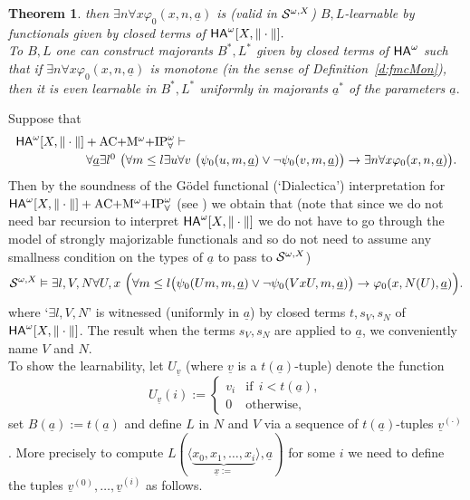 \documentclass[1p]{elsarticle}
\newcommand{\usftext}[1]{\textsf{\upshape #1}}
\newcommand{\ba}{\begin{array}} \newcommand{\ea}{\end{array}}
\newcommand{\ha}{\ensuremath{{\usftext{HA}}^\omega}} %
\renewcommand{\models}{\vDash}  %
\newcommand{\tup}{\underline} %
\newcommand{\Tif}{\text{if}\ }
\newcommand{\Telse}{\text{otherwise}}
\theoremstyle{plain}
\newtheorem{thm}{Theorem}[section]
\theoremstyle{definition}
\theoremstyle{remark}
\renewenvironment{proof}[1][]{\noindent{\bf Proof{#1}. }}{\nopagebreak[4]{\hspace*{\fill}
  $\Box$              %
 }{\vspace{2ex}}}
\renewcommand{\phi}{\varphi}
\theoremstyle{definition}
\begin{document}
{\begin{thm}
then $\exists n\forall x \phi_0(x,n,\tup a)$ 
is (valid in ${\cal S}^{\omega,X}$) $B,L$-learnable by functionals given by 
closed terms of $\ha[X,\|\cdot\|].$ \\
To $B,L$ one can construct majorants 
$B^*,L^*$ given by closed terms of $\ha$ such that 
if $\exists n\forall x \phi_0(x,n,\tup a)$ is monotone (in the sense of Definition~\ref{d:fmcMon}), then it is even learnable in $B^*,L^*$ uniformly in majorants $\underline{a}^*$ of the parameters $\underline{a}.$
\end{thm}
\begin{proof}
Suppose that 
\[ \ba{l} 
\ha[X,\|\cdot\|]+\mbox{AC$+$M$^{\omega}+$IP}^{\omega}_{\forall} 
\vdash \\[1mm] \hspace*{2cm} 
\forall \underline{a}\exists l^0\ \big( 
\forall m\leq l \exists u \forall v\ \big(\psi_0(u,m,\tup a) \vee \neg\psi_0(v,m,\tup a)\big)\rightarrow \exists n \forall x \phi_0(x,n,\tup a)\big).
\ea \]
Then by the soundness of the G\"odel functional (`Dialectica') 
interpretation for $\ha[X,\|\cdot\|]+\mbox{AC$+$M$^{\omega}+$IP}^{\omega}_{\forall}$ (see \cite{Kohlenbach(book)}) we obtain that (note that since we do not need 
bar recursion to interpret $\ha[X,\|\cdot\|]$ we do not have to go through 
the model of strongly majorizable functionals and so do not need to assume 
any smallness condition on the types of $\underline{a}$ to pass to 
${\cal S}^{\omega,X}$)   
\[ {\cal S}^{\omega,X} \models \exists l,V,N \forall U,x\ \Big(\forall m\leq l 
\big (\psi_0(Um,m,\tup a) \vee \neg\psi_0(VxU,m,\tup a)\big)
\rightarrow \phi_0(x,N(U),\tup a)\Big).
\]
where `$\exists l,V,N$' is witnessed (uniformly in $\underline{a}$) 
by closed terms $t,s_V,s_N$ of 
$\ha[X,\|\cdot\|]$. 
The result when the terms $s_V,s_N$ are applied to 
$\tup a$, we conveniently name $V$ and $N$.\\
To show the learnability, let $U_{\tup v}$ (where $\tup v$ is a $t(\tup a)$-tuple) denote the function \[
U_{\tup v}(i):=\begin{cases}
v_i&\Tif\ i<t(\tup a),\\
0&\Telse,
\end{cases}\] set $B(\tup a):=t(\tup a)$ and define $L$ in $N$ and $V$ via a sequence of $t(\tup a)$-tuples $\tup v^{(\cdot)}$.
More precisely to compute $L(\langle \underbrace {x_0,x_1,\ldots,x_i}_{\tup x:=}\rangle,\tup a)$ for some $i$ we need to
define the tuples $\tup v^{(0)},\ldots,\tup v^{(i)}$ as follows.
\begin{enumerate}

\end{enumerate}
\end{proof}}
\end{document}
